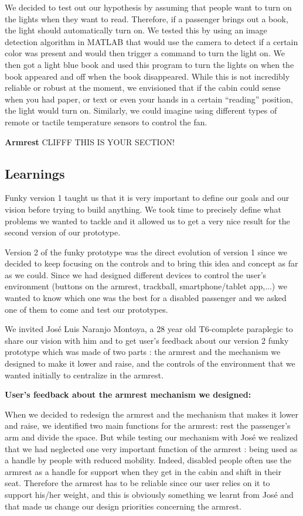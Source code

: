 We decided to test out our hypothesis by assuming that people want to turn on the lights when they want to read. Therefore, if a passenger brings out a book, the light should automatically turn on. We tested this by using an image detection algorithm in MATLAB that would use the camera to detect if a certain color was present and would then trigger a command to turn the light on. We then got a light blue book and used this program to turn the lights on when the book appeared and off when the book disappeared. While this is not incredibly reliable or robust at the moment, we envisioned that if the cabin could sense when you had paper, or text or even your hands in a certain “reading” position, the light would turn on. Similarly, we could imagine using different types of remote or tactile temperature sensors to control the fan.

\textbf{Armrest}
CLIFFF THIS IS YOUR SECTION!

\subsection{Learnings}

Funky version 1 taught us that it is very important to define our goals and our vision before trying to build anything. We took time to precisely define what problems we wanted to tackle and it allowed us to get a very nice result for the second version of our prototype.

Version 2 of the funky prototype was the direct evolution of version 1 since we decided to keep focusing on the controls and to bring this idea and concept as far as we could. Since we had designed different devices to control the user’s environment (buttons on the armrest, trackball, smartphone/tablet app,...) we wanted to know which one was the best for a disabled passenger and we asked one of them to come and test our prototypes.

We invited José Luis Naranjo Montoya, a 28 year old T6-complete paraplegic to share our vision with him and to get user’s feedback about our version 2 funky prototype which was made of two parts : the armrest and the mechanism we designed to make it lower and raise, and the controls of the environment that we wanted initially to centralize in the armrest.

\textbf{User’s feedback about the armrest mechanism we designed:}

When we decided to redesign the armrest and the mechanism that makes it lower and raise, we identified two main functions for the armrest: rest the passenger’s arm and divide the space. But while testing our mechanism with José we realized that we had neglected one very important function of the armrest : being used as a handle by people with reduced mobility. Indeed, disabled people often use the armrest as a handle for support when they get in the cabin and shift in their seat. Therefore the armrest has to be reliable since our user relies on it to support his/her weight, and this is obviously something we learnt from José and that made us change our design priorities concerning the armrest.

